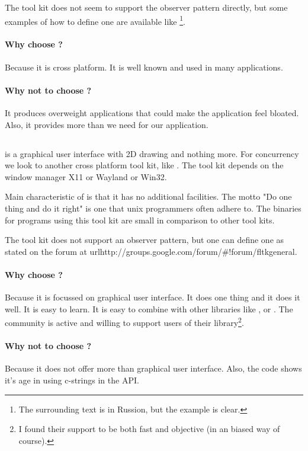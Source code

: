 The tool kit  does not seem to support the observer pattern
directly, but some examples of how to define one are available like
\cite{wxwidget:observer-example}\footnote{The surrounding text is in Russion,
but the example is clear.}.

\paragraph{Why choose ?} Because it is cross platform. It is well
known and used in many applications.
 
\paragraph{Why not to choose ?} It produces overweight applications
that could make the application feel bloated. Also, it provides more than we
need for our application.

\subsection{}

 is a graphical user interface with 2D drawing and nothing more. For
concurrency we look to another cross platform tool kit, like . The
tool kit  depends on the window manager X11 or Wayland or Win32.

Main characteristic of  is that it has no additional facilities.  The
motto "Do one thing and do it right" is one that unix programmers often adhere
to. The binaries for programs using this tool kit are small in comparison to
other tool kits. 

The tool kit  does not support an observer pattern, but one can define
one as stated on the forum at
url{http://groups.google.com/forum/\#!forum/fltkgeneral}.

\paragraph{Why choose ?} Because it is focussed on graphical user
interface.  It does one thing and it does it well. It is easy to learn. It is
easy to combine with other libraries like ,  or .
The community is active and willing to support users of their
library\footnote{I found their support to be both fast and objective (in an
 biased way of course).}. 

\paragraph{Why not to choose ?} Because it does not offer more than
graphical user interface. Also, the code shows it's age in using c-strings in
the API.

